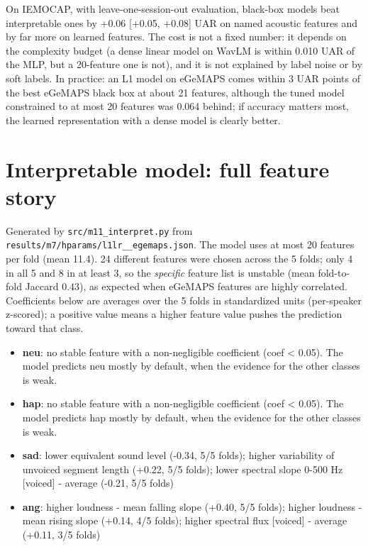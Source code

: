 \documentclass[11pt]{article}
\providecommand{\tightlist}{\setlength{\itemsep}{0pt}\setlength{\parskip}{0pt}}
\begin{document}
On IEMOCAP, with leave-one-session-out evaluation, black-box models beat interpretable ones by +0.06 {[}+0.05, +0.08{]} UAR on named acoustic features and by far more on learned features. The cost is not a fixed number: it depends on the complexity budget (a dense linear model on WavLM is within 0.010 UAR of the MLP, but a 20-feature one is not), and it is not explained by label noise or by soft labels. In practice: an L1 model on eGeMAPS comes within 3 UAR points of the best eGeMAPS black box at about 21 features, although the tuned model constrained to at most 20 features was 0.064 behind; if accuracy matters most, the learned representation with a dense model is clearly better.

\clearpage
\appendix
\section{Interpretable model: full feature story}
Generated by \texttt{src/m11\_interpret.py} from \texttt{results/m7/hparams/l1lr\_\_egemaps.json}. The model uses at most 20 features per fold (mean 11.4). 24 different features were chosen across the 5 folds; only 4 in all 5 and 8 in at least 3, so the \emph{specific} feature list is unstable (mean fold-to-fold Jaccard 0.43), as expected when eGeMAPS features are highly correlated. Coefficients below are averages over the 5 folds in standardized units (per-speaker z-scored); a positive value means a higher feature value pushes the prediction toward that class.

\begin{itemize}
\tightlist
\item
  \textbf{neu}: no stable feature with a non-negligible coefficient (\textbar coef\textbar{} \textless{} 0.05). The model predicts neu mostly by default, when the evidence for the other classes is weak.
\item
  \textbf{hap}: no stable feature with a non-negligible coefficient (\textbar coef\textbar{} \textless{} 0.05). The model predicts hap mostly by default, when the evidence for the other classes is weak.
\item
  \textbf{sad}: lower equivalent sound level (-0.34, 5/5 folds); higher variability of unvoiced segment length (+0.22, 5/5 folds); lower spectral slope 0-500 Hz {[}voiced{]} - average (-0.21, 5/5 folds)
\item
  \textbf{ang}: higher loudness - mean falling slope (+0.40, 5/5 folds); higher loudness - mean rising slope (+0.14, 4/5 folds); higher spectral flux {[}voiced{]} - average (+0.11, 3/5 folds)
\end{itemize}
\end{document}
